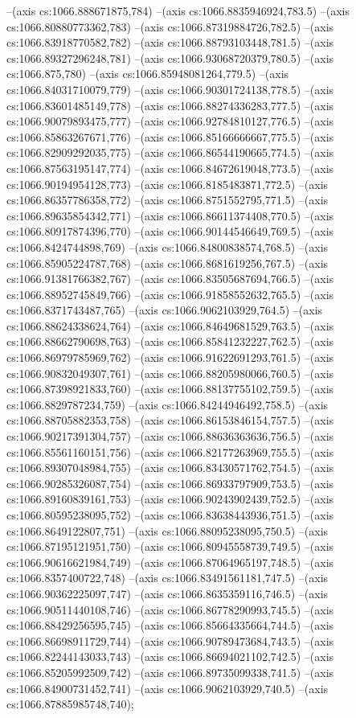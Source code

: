 --(axis cs:1066.888671875,784)
--(axis cs:1066.8835946924,783.5)
--(axis cs:1066.80880773362,783)
--(axis cs:1066.87319884726,782.5)
--(axis cs:1066.83918770582,782)
--(axis cs:1066.88793103448,781.5)
--(axis cs:1066.89327296248,781)
--(axis cs:1066.93068720379,780.5)
--(axis cs:1066.875,780)
--(axis cs:1066.85948081264,779.5)
--(axis cs:1066.84031710079,779)
--(axis cs:1066.90301724138,778.5)
--(axis cs:1066.83601485149,778)
--(axis cs:1066.88274336283,777.5)
--(axis cs:1066.90079893475,777)
--(axis cs:1066.92784810127,776.5)
--(axis cs:1066.85863267671,776)
--(axis cs:1066.85166666667,775.5)
--(axis cs:1066.82909292035,775)
--(axis cs:1066.86544190665,774.5)
--(axis cs:1066.87563195147,774)
--(axis cs:1066.84672619048,773.5)
--(axis cs:1066.90194954128,773)
--(axis cs:1066.8185483871,772.5)
--(axis cs:1066.86357786358,772)
--(axis cs:1066.8751552795,771.5)
--(axis cs:1066.89635854342,771)
--(axis cs:1066.86611374408,770.5)
--(axis cs:1066.80917874396,770)
--(axis cs:1066.90144546649,769.5)
--(axis cs:1066.8424744898,769)
--(axis cs:1066.84800838574,768.5)
--(axis cs:1066.85905224787,768)
--(axis cs:1066.8681619256,767.5)
--(axis cs:1066.91381766382,767)
--(axis cs:1066.83505687694,766.5)
--(axis cs:1066.88952745849,766)
--(axis cs:1066.91858552632,765.5)
--(axis cs:1066.8371743487,765)
--(axis cs:1066.9062103929,764.5)
--(axis cs:1066.88624338624,764)
--(axis cs:1066.84649681529,763.5)
--(axis cs:1066.88662790698,763)
--(axis cs:1066.85841232227,762.5)
--(axis cs:1066.86979785969,762)
--(axis cs:1066.91622691293,761.5)
--(axis cs:1066.90832049307,761)
--(axis cs:1066.88205980066,760.5)
--(axis cs:1066.87398921833,760)
--(axis cs:1066.88137755102,759.5)
--(axis cs:1066.8829787234,759)
--(axis cs:1066.84244946492,758.5)
--(axis cs:1066.88705882353,758)
--(axis cs:1066.86153846154,757.5)
--(axis cs:1066.90217391304,757)
--(axis cs:1066.88636363636,756.5)
--(axis cs:1066.85561160151,756)
--(axis cs:1066.82177263969,755.5)
--(axis cs:1066.89307048984,755)
--(axis cs:1066.83430571762,754.5)
--(axis cs:1066.90285326087,754)
--(axis cs:1066.86933797909,753.5)
--(axis cs:1066.89160839161,753)
--(axis cs:1066.90243902439,752.5)
--(axis cs:1066.80595238095,752)
--(axis cs:1066.83638443936,751.5)
--(axis cs:1066.8649122807,751)
--(axis cs:1066.88095238095,750.5)
--(axis cs:1066.87195121951,750)
--(axis cs:1066.80945558739,749.5)
--(axis cs:1066.90616621984,749)
--(axis cs:1066.87064965197,748.5)
--(axis cs:1066.8357400722,748)
--(axis cs:1066.83491561181,747.5)
--(axis cs:1066.90362225097,747)
--(axis cs:1066.8635359116,746.5)
--(axis cs:1066.90511440108,746)
--(axis cs:1066.86778290993,745.5)
--(axis cs:1066.88429256595,745)
--(axis cs:1066.85664335664,744.5)
--(axis cs:1066.86698911729,744)
--(axis cs:1066.90789473684,743.5)
--(axis cs:1066.82244143033,743)
--(axis cs:1066.86694021102,742.5)
--(axis cs:1066.85205992509,742)
--(axis cs:1066.89735099338,741.5)
--(axis cs:1066.84900731452,741)
--(axis cs:1066.9062103929,740.5)
--(axis cs:1066.87885985748,740);

